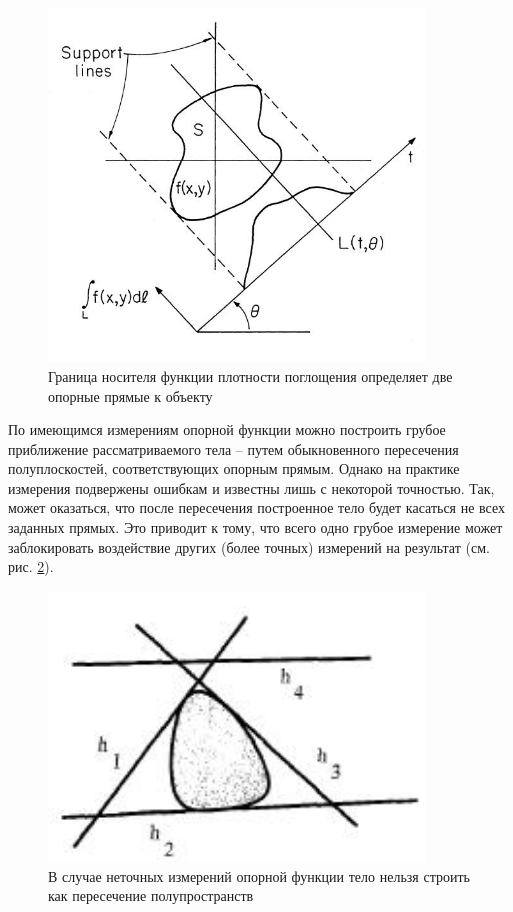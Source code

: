\documentclass[a4paper,12pt, titlepage]{article}
\begin{document}
\begin{figure}[ht]
    \includegraphics[width=10cm]{images/tomography-application.jpg}
    \caption{Граница носителя функции плотности поглощения определяет две
    опорные прямые к объекту}
    \label{tomography-application}
\end{figure}

По имеющимся измерениям опорной функции можно построить грубое приближение
рассматриваемого тела -- путем обыкновенного пересечения полуплоскостей,
соответствующих опорным прямым. Однако на практике измерения подвержены
ошибкам и известны лишь с некоторой точностью. Так, может оказаться, что
после пересечения построенное тело будет касаться не всех заданных прямых.
Это приводит к тому, что всего одно грубое измерение может заблокировать
воздействие других (более точных) измерений на результат (см. рис.
\ref{inconsistent}).

\begin{figure}[ht]
    \includegraphics[width=10cm]{images/inconsistent-support-planes.jpg}
    \caption{В случае неточных измерений опорной функции тело нельзя строить
    как пересечение полупространств}
    \label{inconsistent}
\end{figure}
\end{document}
